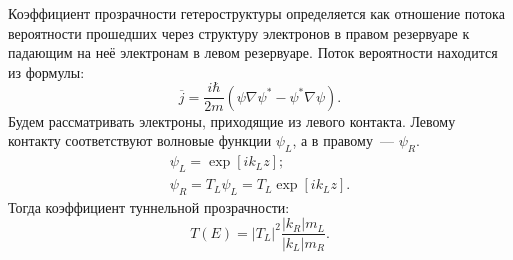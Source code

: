Коэффициент прозрачности гетероструктуры определяется   как   отношение потока вероятности прошедших  через  структуру электронов  в  правом резервуаре к  падающим  на  неё  электронам  в  левом  резервуаре.  Поток вероятности находится из формулы:
\begin{equation}
	\label{eq:jP}
	\overline{j} = \frac{i\hbar}{2m}(\psi\nabla\psi^{*} - \psi^{*}\nabla\psi).
\end{equation}
Будем рассматривать электроны, приходящие из левого контакта. Левому контакту соответствуют волновые функции $\psi_{L}$, а в правому~---  $\psi_{R}$.
\begin{gather}
	\label{eq:psiL}
	\psi_{L} = \exp [ik_{L}z];\\
	\label{eq:psiR}
	\psi_{R} = T_{L}\psi_{L} = T_{L}\exp [ik_{L}z].
\end{gather}
Тогда коэффициент туннельной прозрачности:
\begin{equation}
	T(E) = |T_{L}|^{2}\frac{|k_{R}|m_{L}}{|k_{L}|m_{R}}.
\end{equation}
